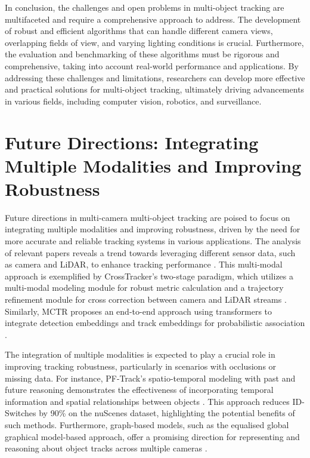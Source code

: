 \documentclass[conference]{IEEEtran}
\begin{document}
In conclusion, the challenges and open problems in multi-object tracking are multifaceted and require a comprehensive approach to address. The development of robust and efficient algorithms that can handle different camera views, overlapping fields of view, and varying lighting conditions is crucial. Furthermore, the evaluation and benchmarking of these algorithms must be rigorous and comprehensive, taking into account real-world performance and applications. By addressing these challenges and limitations, researchers can develop more effective and practical solutions for multi-object tracking, ultimately driving advancements in various fields, including computer vision, robotics, and surveillance.

\section{Future Directions: Integrating Multiple Modalities and Improving Robustness}
Future directions in multi-camera multi-object tracking are poised to focus on integrating multiple modalities and improving robustness, driven by the need for more accurate and reliable tracking systems in various applications. The analysis of relevant papers reveals a trend towards leveraging different sensor data, such as camera and LiDAR, to enhance tracking performance \cite{CrossTracker}. This multi-modal approach is exemplified by CrossTracker's two-stage paradigm, which utilizes a multi-modal modeling module for robust metric calculation and a trajectory refinement module for cross correction between camera and LiDAR streams \cite{CrossTracker}. Similarly, MCTR proposes an end-to-end approach using transformers to integrate detection embeddings and track embeddings for probabilistic association \cite{MCTR}.

The integration of multiple modalities is expected to play a crucial role in improving tracking robustness, particularly in scenarios with occlusions or missing data. For instance, PF-Track's spatio-temporal modeling with past and future reasoning demonstrates the effectiveness of incorporating temporal information and spatial relationships between objects \cite{PF-Track}. This approach reduces ID-Switches by 90\% on the nuScenes dataset, highlighting the potential benefits of such methods. Furthermore, graph-based models, such as the equalised global graphical model-based approach, offer a promising direction for representing and reasoning about object tracks across multiple cameras \cite{GlobalGraphModel}.
\end{document}
